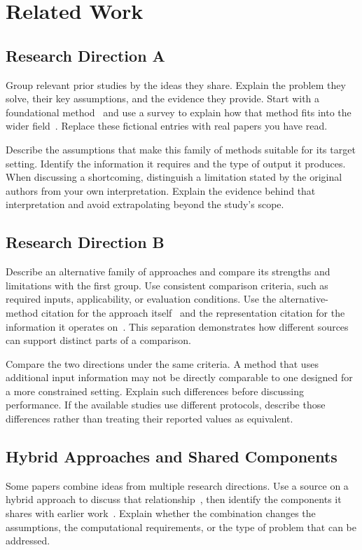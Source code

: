 \section{Related Work}
\label{sec:related}
\subsection{Research Direction A}
Group relevant prior studies by the ideas they share. Explain the problem
they solve, their key assumptions, and the evidence they provide.
Start with a foundational method~\cite{foundational} and use a survey to
explain how that method fits into the wider field~\cite{survey}.
Replace these fictional entries with real papers you have read.

Describe the assumptions that make this family of methods suitable for its
target setting. Identify the information it requires and the type of output
it produces. When discussing a shortcoming, distinguish a limitation stated
by the original authors from your own interpretation. Explain the evidence
behind that interpretation and avoid extrapolating beyond the study's scope.

\subsection{Research Direction B}
Describe an alternative family of approaches and compare its strengths
and limitations with the first group. Use consistent comparison criteria,
such as required inputs, applicability, or evaluation conditions.
Use the alternative-method citation for the approach itself~\cite{alternative}
and the representation citation for the information it operates
on~\cite{representation}. This separation demonstrates how different sources
can support distinct parts of a comparison.

Compare the two directions under the same criteria. A method that uses
additional input information may not be directly comparable to one designed
for a more constrained setting. Explain such differences before discussing
performance. If the available studies use different protocols, describe
those differences rather than treating their reported values as equivalent.

\subsection{Hybrid Approaches and Shared Components}
Some papers combine ideas from multiple research directions. Use a source
on a hybrid approach to discuss that relationship~\cite{hybrid}, then identify
the components it shares with earlier work~\cite{foundational,alternative}.
Explain whether the combination changes the assumptions, the computational
requirements, or the type of problem that can be addressed.

